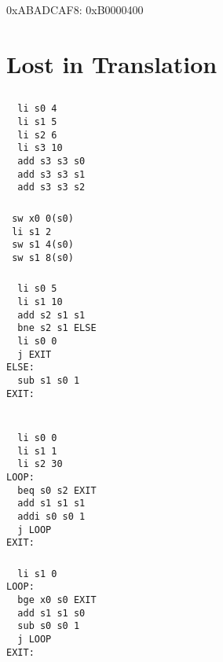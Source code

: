 \documentclass[UTF8,nofonts]{ctexart}
\begin{document}
0xABADCAF8: 0xB0000400

\section{Lost in Translation}
\subsection{}
\subsubsection*{}
\begin{verbatim}
  li s0 4
  li s1 5
  li s2 6
  li s3 10
  add s3 s3 s0
  add s3 s3 s1
  add s3 s3 s2
\end{verbatim}

\subsubsection*{}
\begin{verbatim}
 sw x0 0(s0)
 li s1 2
 sw s1 4(s0)
 sw s1 8(s0)
\end{verbatim}

\subsubsection*{}
\begin{verbatim}
  li s0 5
  li s1 10
  add s2 s1 s1
  bne s2 s1 ELSE
  li s0 0
  j EXIT
ELSE:
  sub s1 s0 1
EXIT:
  
\end{verbatim}

\subsubsection*{}
\begin{verbatim}
  li s0 0
  li s1 1
  li s2 30
LOOP:
  beq s0 s2 EXIT
  add s1 s1 s1
  addi s0 s0 1
  j LOOP
EXIT:
\end{verbatim}

\subsubsection*{}
\begin{verbatim}
  li s1 0
LOOP:
  bge x0 s0 EXIT
  add s1 s1 s0
  sub s0 s0 1
  j LOOP
EXIT:

\end{verbatim}
\end{document}
